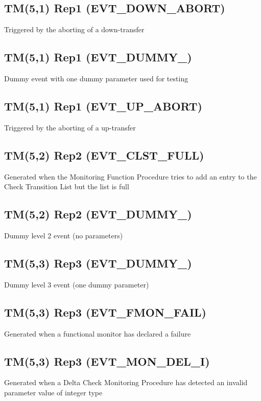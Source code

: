 \pagebreak
\subsection{TM(5,1) Rep1 (EVT\_\-DOWN\_\-ABORT)}
Triggered by the aborting of a down-transfer

\pagebreak
\subsection{TM(5,1) Rep1 (EVT\_\-DUMMY\_)}
Dummy event with one dummy parameter used for testing

\pagebreak
\subsection{TM(5,1) Rep1 (EVT\_\-UP\_\-ABORT)}
Triggered by the aborting of a up-transfer

\pagebreak
\subsection{TM(5,2) Rep2 (EVT\_\-CLST\_\-FULL)}
Generated when the Monitoring Function Procedure tries to add an entry to the Check Transition List but the list is full

\pagebreak
\subsection{TM(5,2) Rep2 (EVT\_\-DUMMY\_)}
Dummy level 2 event (no parameters)

\pagebreak
\subsection{TM(5,3) Rep3 (EVT\_\-DUMMY\_)}
Dummy level 3 event (one dummy parameter)

\pagebreak
\subsection{TM(5,3) Rep3 (EVT\_\-FMON\_\-FAIL)}
Generated when a functional monitor has declared a failure

\pagebreak
\subsection{TM(5,3) Rep3 (EVT\_\-MON\_\-DEL\_\-I)}
Generated when a Delta Check Monitoring Procedure has detected an invalid parameter value of integer type

